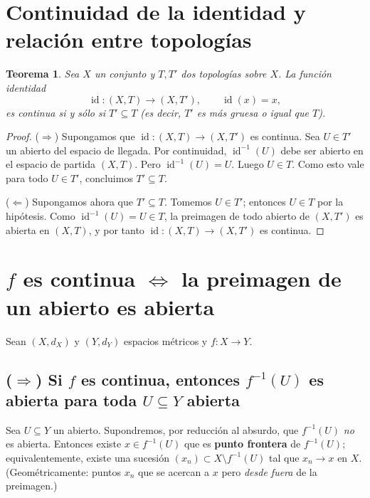 \documentclass[12pt]{article}
\newtheorem{theorem}{Teorema}
\begin{document}
\section*{Continuidad de la identidad y relación entre topologías}

\begin{theorem}
Sea $X$ un conjunto y $T,T'$ dos topologías sobre $X$.
La función identidad
\[
\operatorname{id}:(X,T)\longrightarrow (X,T'),\qquad \operatorname{id}(x)=x,
\]
es continua \emph{si y sólo si} $T'\subseteq T$ (es decir, $T'$ es más \emph{gruesa} o igual que $T$).
\end{theorem}

\begin{proof}
($\Rightarrow$) Supongamos que $\operatorname{id}:(X,T)\to (X,T')$ es continua.
Sea $U\in T'$ un abierto del espacio de llegada. Por continuidad,
$\operatorname{id}^{-1}(U)$ debe ser abierto en el espacio de partida $(X,T)$.
Pero $\operatorname{id}^{-1}(U)=U$. Luego $U\in T$.
Como esto vale para todo $U\in T'$, concluimos $T'\subseteq T$.

($\Leftarrow$) Supongamos ahora que $T'\subseteq T$.
Tomemos $U\in T'$; entonces $U\in T$ por la hipótesis.
Como $\operatorname{id}^{-1}(U)=U\in T$, la preimagen de todo abierto de $(X,T')$
es abierta en $(X,T)$, y por tanto $\operatorname{id}:(X,T)\to (X,T')$ es continua.
\end{proof}
\section*{$f$ es continua $\iff$ la preimagen de un abierto es abierta}

Sean $(X,d_X)$ y $(Y,d_Y)$ espacios métricos y $f:X\to Y$.

\subsection*{($\Rightarrow$) Si $f$ es continua, entonces $f^{-1}(U)$ es abierta para toda $U\subseteq Y$ abierta}
Sea $U\subseteq Y$ un abierto. Supondremos, por reducción al absurdo, que $f^{-1}(U)$ \emph{no} es abierta.
Entonces existe $x\in f^{-1}(U)$ que es \textbf{punto frontera} de $f^{-1}(U)$; equivalentemente,
existe una sucesión $(x_n)\subset X\setminus f^{-1}(U)$ tal que $x_n\to x$ en $X$.
(Geométricamente: puntos $x_n$ que se acercan a $x$ pero \emph{desde fuera} de la preimagen.)
\end{document}

